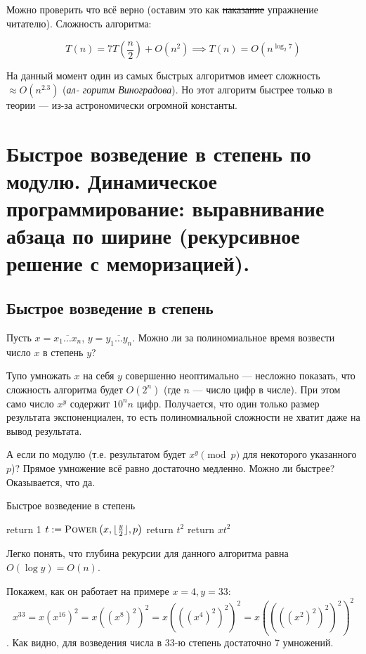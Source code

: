 \documentclass[a4paper,12pt]{article}
\begin{document}
Можно проверить что всё верно (оставим это как \sout{наказание} упражнение читателю). Сложность алгоритма:

\[T(n) = 7T\left( \frac{n}{2} \right) + O(n^2) \implies T(n) = O\left(n^{\log_{2} 7} \right)\]

На данный момент один из самых быстрых алгоритмов имеет сложность $\approx O(n^{2.3})$ (\emph{ал-
горитм Виноградова}). Но этот алгоритм быстрее только в теории — из-за астрономически
огромной константы.
\newpage
\section{Быстрое возведение в степень по модулю. Динамическое программирование: выравнивание абзаца по ширине (рекурсивное решение с меморизацией).}

\subsection{Быстрое возведение в степень}
Пусть $x = \overline{x_1 \ldots x_n}$, $y = \overline{y_1 \ldots y_n}$. Можно ли за полиномиальное время возвести число $x$ в степень $y$?

Тупо умножать $x$ на себя $y$ совершенно неоптимально --- несложно показать, что сложность алгоритма будет $O(2^n)$ (где $n$ --- число цифр в числе). При этом само число $x^y$ содержит $10^{n}n$ цифр. Получается, что один только размер результата экспоненциален, то есть полиномиальной сложности не хватит даже на вывод результата.

А если по модулю (т.е. результатом будет $x^y \pmod{p}$ для некоторого указанного $p$)? Прямое умножение всё равно достаточно медленно. Можно ли быстрее? Оказывается, что да.

\begin{algorithm}
	\caption{Быстрое возведение в степень}
	\begin{algorithmic}[1]
			\State return 1
		\EndIf
		\State $t \mathrel{:=} \textsc{Power}\left(x, \lfloor\frac{y}{2}\rfloor, p \right)$
			\State return $t^2$
		\Else
			\State return $xt^2$
		\EndIf
		\EndFunction
	\end{algorithmic}
\end{algorithm}

Легко понять, что глубина рекурсии для данного алгоритма равна $O(\log y) = O(n)$.

Покажем, как он работает на примере $x = 4, y = 33$: \[x^{33} = x(x^{16})^{2} = x((x^{8})^2)^2 = x(((x^4)^2)^2)^2 = x((((x^2)^2)^2)^2)^2 \].
Как видно, для возведения числа в 33-ю степень достаточно 7 умножений.
\end{document}
